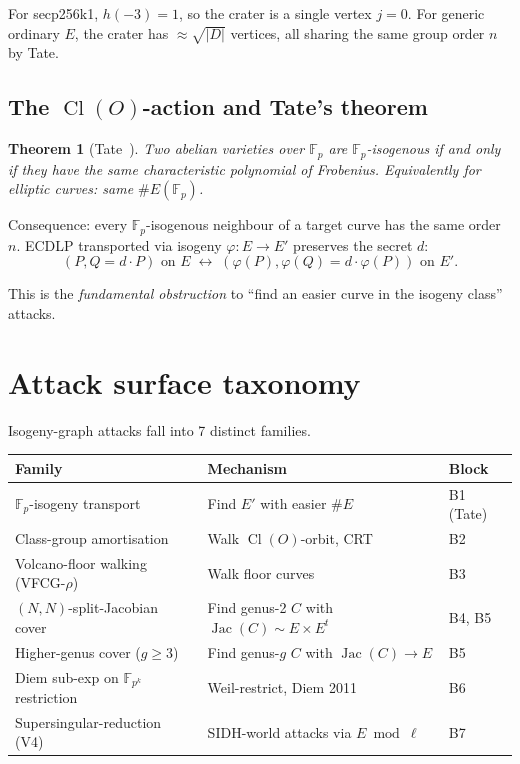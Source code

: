 \documentclass[11pt,a4paper]{article}
\newtheorem{theorem}{Theorem}[section]
\theoremstyle{definition}
\newcommand{\FF}{\mathbb{F}}
\newcommand{\Cl}{\operatorname{Cl}}
\newcommand{\Jac}{\operatorname{Jac}}
\begin{document}
For secp256k1, $h(-3) = 1$, so the crater is a single vertex
$j = 0$. For generic ordinary $E$, the crater has $\approx
\sqrt{|D|}$ vertices, all sharing the same group order $n$ by
Tate.

\subsection{The $\Cl(O)$-action and Tate's theorem}

\begin{theorem}[Tate~\cite{tate1966}]
Two abelian varieties over $\FF_p$ are $\FF_p$-isogenous if and
only if they have the same characteristic polynomial of Frobenius.
Equivalently for elliptic curves: same $\#E(\FF_p)$.
\end{theorem}

Consequence: every $\FF_p$-isogenous neighbour of a target curve
has the same order $n$. ECDLP transported via isogeny
$\varphi \colon E \to E'$ preserves the secret $d$:
\[
   (P, Q = d \cdot P) \text{ on } E \;\longleftrightarrow\;
   (\varphi(P), \varphi(Q) = d \cdot \varphi(P)) \text{ on } E'.
\]

This is the \emph{fundamental obstruction} to ``find an easier
curve in the isogeny class'' attacks.

\section{Attack surface taxonomy}\label{sec:taxonomy}

Isogeny-graph attacks fall into 7 distinct families.

\begin{center}
\begin{tabular}{lll}
\toprule
Family & Mechanism & Block \\
\midrule
$\FF_p$-isogeny transport & Find $E'$ with easier $\#E$ & B1 (Tate) \\
Class-group amortisation & Walk $\Cl(O)$-orbit, CRT & B2 \\
Volcano-floor walking (VFCG-$\rho$) & Walk floor curves & B3 \\
$(N,N)$-split-Jacobian cover & Find genus-2 $C$ with $\Jac(C) \sim E \times E^t$ & B4, B5 \\
Higher-genus cover ($g \geq 3$) & Find genus-$g$ $C$ with $\Jac(C) \to E$ & B5 \\
Diem sub-exp on $\FF_{p^k}$ restriction & Weil-restrict, Diem 2011 & B6 \\
Supersingular-reduction (V4) & SIDH-world attacks via $E \bmod \ell$ & B7 \\
\bottomrule
\end{tabular}
\end{center}
\end{document}

